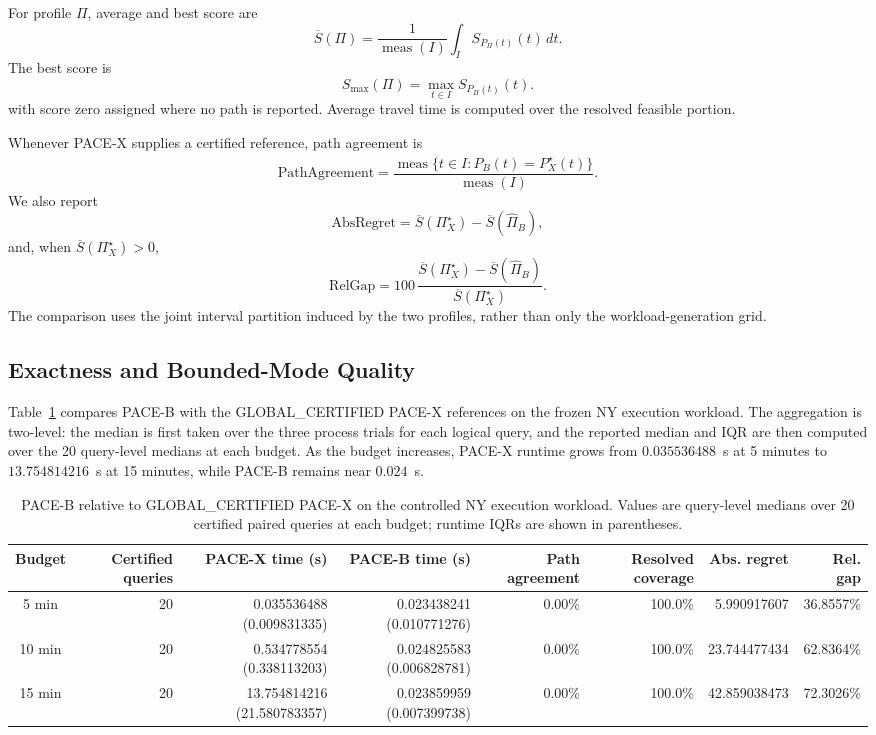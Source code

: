 \documentclass[a4paper,fleqn]{cas-dc}
\begin{document}
For profile \(\Pi\), average and best score are
\[
\overline S(\Pi)
=
\frac{1}{\operatorname{meas}(I)}
\int_I S_{P_\Pi(t)}(t)\,dt.
\]
The best score is
\[
S_{\max}(\Pi)=\max_{t\in I}S_{P_\Pi(t)}(t).
\]
with score zero assigned where no path is reported. Average travel time is computed over the resolved feasible portion.

Whenever PACE-X supplies a certified reference, path agreement is
\[
\mathrm{PathAgreement}
=
\frac{\operatorname{meas}\{t\in I:\widehat P_B(t)=P_X^\star(t)\}}
{\operatorname{meas}(I)}.
\]
We also report
\[
\mathrm{AbsRegret}
=
\overline S(\Pi_X^\star)-\overline S(\widehat\Pi_B),
\]
and, when \(\overline S(\Pi_X^\star)>0\),
\[
\mathrm{RelGap}
=
100\,
\frac{\overline S(\Pi_X^\star)-\overline S(\widehat\Pi_B)}
{\overline S(\Pi_X^\star)}.
\]
The comparison uses the joint interval partition induced by the two profiles, rather than only the workload-generation grid.

\subsection{Exactness and Bounded-Mode Quality}
\label{subsec:exp_exactness}

Table~\ref{tab:exact_quality} compares PACE-B with the GLOBAL\_CERTIFIED PACE-X references on the frozen NY execution workload. The aggregation is two-level: the median is first taken over the three process trials for each logical query, and the reported median and IQR are then computed over the 20 query-level medians at each budget. As the budget increases, PACE-X runtime grows from \(0.035536488\)~s at 5 minutes to \(13.754814216\)~s at 15 minutes, while PACE-B remains near \(0.024\)~s.

\begin{table}[t]
\centering
\caption{PACE-B relative to GLOBAL\_CERTIFIED PACE-X on the controlled NY execution workload. Values are query-level medians over 20 certified paired queries at each budget; runtime IQRs are shown in parentheses.}
\label{tab:exact_quality}
\scriptsize
\setlength{\tabcolsep}{5pt}
\begin{tabular}{@{}crrrrrrr@{}}
\toprule
\textbf{Budget} & \textbf{Certified queries} & \textbf{PACE-X time (s)} & \textbf{PACE-B time (s)} & \textbf{Path agreement} & \textbf{Resolved coverage} & \textbf{Abs. regret} & \textbf{Rel. gap} \\
\midrule
5 min  & 20 & 0.035536488 (0.009831335) & 0.023438241 (0.010771276) & 0.00\% & 100.0\% & 5.990917607 & 36.8557\% \\
10 min & 20 & 0.534778554 (0.338113203) & 0.024825583 (0.006828781) & 0.00\% & 100.0\% & 23.744477434 & 62.8364\% \\
15 min & 20 & 13.754814216 (21.580783357) & 0.023859959 (0.007399738) & 0.00\% & 100.0\% & 42.859038473 & 72.3026\% \\
\bottomrule
\end{tabular}
\end{table}
\end{document}
